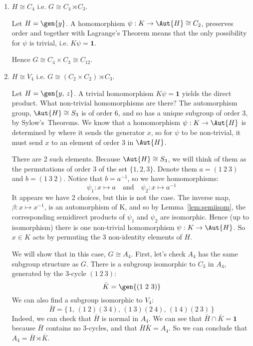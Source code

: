 \begin{enumerate}
    \item \(H \cong C_4\) i.e. \(G \cong C_4 \rtimes C_3\).

        Let \(H = \gen{y}\).
        A homomorphism \(\psi:K \to \Aut{H} \cong C_2\), preserves order and together with Lagrange's Theorem means that
        the only possibility for \(\psi\) is trivial, i.e. \(K\psi = \bm{1}\).

        Hence \(G \cong C_4 \times C_3 \cong C_{12}\).
    \item \(H \cong V_4\) i.e. \(G \cong (C_2 \times C_2) \rtimes C_3\).

        Let \(H = \gen{y,\,z}\).
        A trivial homomorphism \(K\psi = \bm{1}\) yields the direct product.
        What non-trivial homomorphisms are there?
        The automorphism group, \(\Aut{H} \cong S_3\) is of order 6, and so has a unique subgroup of order 3, by
        Sylow's~Theorems.
        We know that a homomorphism \(\psi: K \to \Aut{H}\) is determined by where it sends the generator
        \(x\), so for \(\psi\) to be non-trivial, it must send \(x\) to an element of order 3 in \(\Aut{H}\).

        There are 2 such elements.
        Because \(\Aut{H} \cong S_3\), we will think of them as the permutations of order 3 of the set \(\{1, 2, 3\}\).
        Denote them \(a = (1\ 2\ 3)\) and \(b = (1\ 3\ 2)\).
        Notice that \(b = a^{-1}\), so we have homomorphisms:
        \[\psi_1:x \mapsto a \quad \text{and} \quad \psi_2:x \mapsto a^{-1}\]
        It appears we have 2 choices, but this is not the case.
        The inverse map, \(\beta:x \mapsto x^{-1}\), is an automorphism of K, and so by Lemma~\ref{lem:semiisom}, the
        corresponding semidirect products of \(\psi_1\) and \(\psi_2\) are isomorphic.
        Hence (up to isomorphism) there is one non-trivial homomorphism \(\psi:K \to \Aut{H}\).
        So \(x \in K\) acts by permuting the 3 non-identity elements of \(H\).

        We will show that in this case, \(G \cong A_4\).
        First, let's check \(A_4\) has the same subgroup structure as \(G\).
        There is a subgroup isomorphic to \(C_3\) in \(A_4\), generated by the 3-cycle \((1\ 2\ 3)\):
        \[\bar{K} = \gen{(1\ 2\ 3)}\]
        We can also find a subgroup isomorphic to \(V_4\):
        \[\bar{H} = \{\,1,\, (1\ 2)(3\ 4),\, (1\ 3)(2\ 4),\, (1\ 4)(2\ 3)\,\}\]
        Indeed, we can check that \(\bar{H}\) is normal in \(A_4\).
        We can see that \(\bar{H} \cap \bar{K} = \bm{1}\) because \(\bar{H}\) contains no 3-cycles, and that
        \(\bar{H}\bar{K} = A_4\).
        So we can conclude that \(A_4 = \bar{H} \rtimes \bar{K}\).


\end{enumerate}
